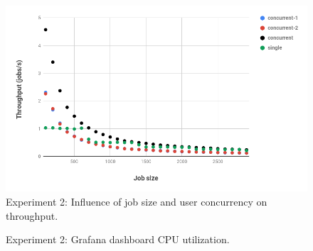 \begin{figure}[H]
    \centering
    \includegraphics[width=1\textwidth]{chapter-evaluation/jobsize-cpu.png}
    \caption{Experiment 2: Influence of job size and  user concurrency on throughput. }
    \label{fig:exp2B-jobsize}
\end{figure}
\begin{figure}[H]
\centering
{}
\caption{Experiment 2: Grafana dashboard CPU utilization. }
\label{fig:jobsizegrafana}
\end{figure}


